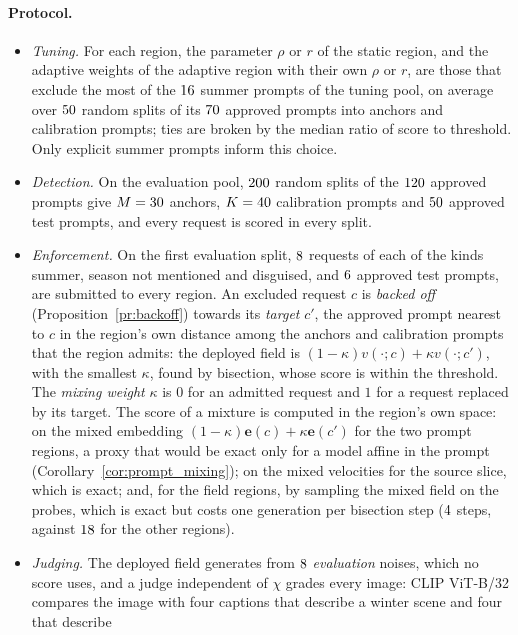 \documentclass{article}
\newcommand{\be}{\mathbf{e}}
\theoremstyle{plain}
\theoremstyle{remark}
\begin{document}
\paragraph{Protocol.}
\begin{itemize}
\item \emph{Tuning.} For each region, the parameter $\rho$ or $r$ of the static region, and the adaptive weights of the adaptive region
with their own $\rho$ or $r$, are those that exclude the most of the $16$ summer prompts of the tuning pool, on average
over $50$ random splits of its $70$ approved prompts into anchors and calibration prompts; ties are broken by the
median ratio of score to threshold. Only explicit summer prompts inform this choice.
\item \emph{Detection.} On the evaluation pool, $200$ random splits of the $120$ approved prompts give $M=30$ anchors,
$K=40$ calibration prompts and $50$ approved test prompts, and every request is scored in every split.
\item \emph{Enforcement.} On the first evaluation split, $8$ requests of each of the kinds summer, season not mentioned and
disguised, and $6$ approved test prompts, are submitted to every region. An excluded request $c$ is \emph{backed off}
(Proposition~\ref{pr:backoff}) towards its \emph{target} $c'$, the approved prompt nearest to $c$ in the region's own distance among
the anchors and calibration prompts that the region admits: the deployed field is $(1-\kappa)v(\cdot;c)+\kappa v(\cdot;c')$, with
the smallest $\kappa$, found by bisection, whose score is within the threshold. The \emph{mixing weight} $\kappa$ is $0$ for an
admitted request and $1$ for a request replaced by its target. The score of a mixture is computed in the region's own space: on the
mixed embedding $(1-\kappa)\be(c)+\kappa\be(c')$ for the two prompt regions, a proxy that would be exact only for a model affine in
the prompt (Corollary~\ref{cor:prompt_mixing}); on the mixed velocities for the source slice, which is exact; and, for the field
regions, by sampling the mixed field on the probes, which is exact but costs one generation per bisection step ($4$
steps, against $18$ for the other regions).
\item \emph{Judging.} The deployed field generates from $8$ \emph{evaluation} noises, which no score uses, and a judge independent of
$\chi$ grades every image: CLIP ViT-B/32 compares the image with four captions that describe a winter scene and four that describe

\end{itemize}
\end{document}

